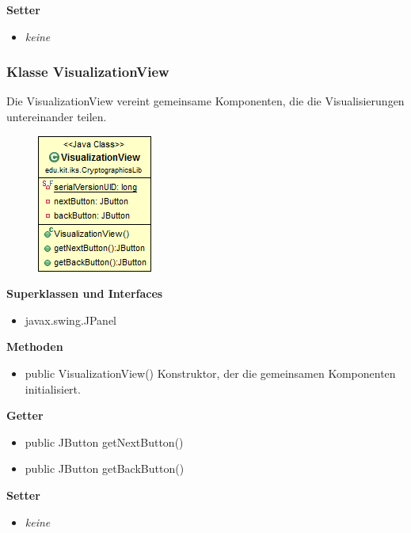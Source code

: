 \documentclass{article}
\begin{document}
      \textbf{Setter}
      \begin{itemize}
        \item \textit{keine}
      \end{itemize}
	
	\subsubsection{Klasse VisualizationView}
	  Die VisualizationView vereint gemeinsame Komponenten, die die Visualisierungen
	  untereinander teilen.
	
      \begin{figure}[H]
        \centering
        \includegraphics{resources/edu-kit-iks-CryptographicsLib-VisualizationView}
      \end{figure}
	
      \textbf{Superklassen und Interfaces}
      \begin{itemize}
        \item javax.swing.JPanel
      \end{itemize}
	
      \textbf{Methoden}
      \begin{itemize}
        \item public VisualizationView() \newline
          Konstruktor, der die gemeinsamen Komponenten initialisiert.
      \end{itemize}
      
      \textbf{Getter}
      \begin{itemize}
		\item public JButton getNextButton()
		\item public JButton getBackButton()
      \end{itemize}
      
      \textbf{Setter}
      \begin{itemize}
        \item \textit{keine}
      \end{itemize}
	
\end{document}
